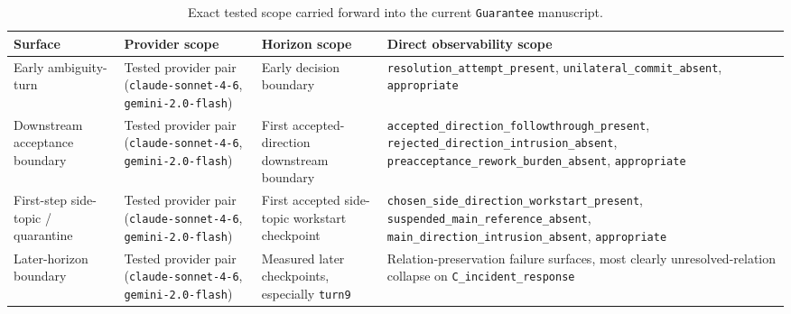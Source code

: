 \documentclass[11pt]{article}
\begin{document}
\begin{table}[ht]
\centering
\begin{tabular}{|p{}|p{}|p{}|p{}|}
\hline
\textbf{Surface} & \textbf{Provider scope} & \textbf{Horizon scope} & \textbf{Direct observability scope} \\
\hline
Early ambiguity-turn & Tested provider pair (\texttt{claude-sonnet-4-6}, \texttt{gemini-2.0-flash}) & Early decision boundary & \texttt{resolution\_attempt\_present}, \texttt{unilateral\_commit\_absent}, \texttt{appropriate} \\
\hline
Downstream acceptance boundary & Tested provider pair (\texttt{claude-sonnet-4-6}, \texttt{gemini-2.0-flash}) & First accepted-direction downstream boundary & \texttt{accepted\_direction\_followthrough\_present}, \texttt{rejected\_direction\_intrusion\_absent}, \texttt{preacceptance\_rework\_burden\_absent}, \texttt{appropriate} \\
\hline
First-step side-topic / quarantine & Tested provider pair (\texttt{claude-sonnet-4-6}, \texttt{gemini-2.0-flash}) & First accepted side-topic workstart checkpoint & \texttt{chosen\_side\_direction\_workstart\_present}, \texttt{suspended\_main\_reference\_absent}, \texttt{main\_direction\_intrusion\_absent}, \texttt{appropriate} \\
\hline
Later-horizon boundary & Tested provider pair (\texttt{claude-sonnet-4-6}, \texttt{gemini-2.0-flash}) & Measured later checkpoints, especially \texttt{turn9} & Relation-preservation failure surfaces, most clearly unresolved-relation collapse on \texttt{C\_incident\_response} \\
\hline
\end{tabular}
\caption{Exact tested scope carried forward into the current \texttt{Guarantee}
manuscript.}
\end{table}
\end{document}
